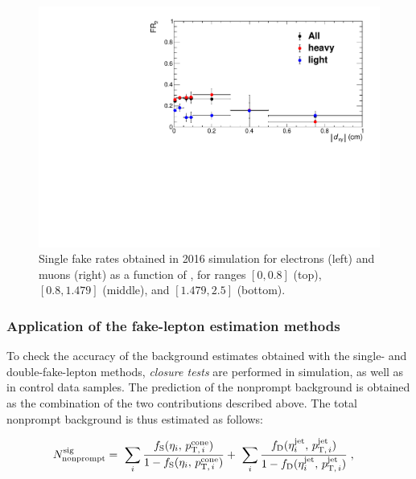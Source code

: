\begin{figure}[h]
  \includegraphics[width=.45\textwidth]{Figures/c6/backgrounds/FR/sFR/QCD/dxy_mu_eta3_FR2.pdf}
  \caption{Single fake rates obtained in 2016 simulation for electrons
    (left) and muons (right) as
    a function of \dxy, for \abseta ranges $[0,0.8]$ (top),
    $[0.8,1.479]$ (middle), and $[1.479,2.5]$ (bottom).}
  \label{fig:sfr_dxy}
\end{figure}
\subsubsection{Application of the fake-lepton estimation methods}\label{sec:frChecks}
To check the accuracy of the background estimates obtained with the
single- and double-fake-lepton methods, \emph{closure tests} are
performed in simulation, as well as in control data samples. 
The prediction of the nonprompt background is obtained as the
combination of the two contributions described above. The total
nonprompt background is thus estimated as follows:
\begin{linenomath}
  \begin{align*}
    N_{\mathrm{nonprompt}}^{\mathrm{sig}} & =~ 
    \sum_i\frac{f_{\mathrm{S}}(\eta_i,\,p_{\mathrm{T,\,}i}^{\mathrm{cone}})}{1-f_{\mathrm{S}}(\eta_i,\,p_{\mathrm{T,\,}i}^{\mathrm{cone}})}
    +~
    \sum_i\frac{f_{\mathrm{D}}(\eta^{\mathrm{jet}}_i,\,p_{\mathrm{T,\,}i}^{\mathrm{jet}})}{1-f_{\mathrm{D}}(\eta^{\mathrm{jet}}_i,\,p_{\mathrm{T,\,}i}^{\mathrm{jet}})}\;,
  \end{align*}
\end{linenomath}

